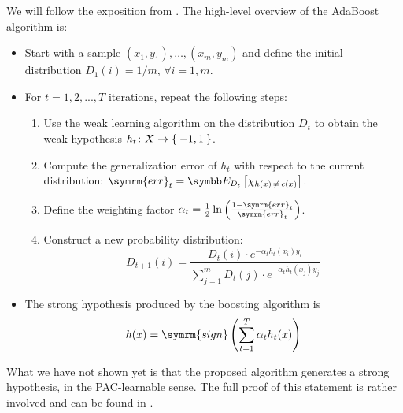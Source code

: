 We will follow the exposition from \cite{Schapire2018}. The high-level overview of the AdaBoost algorithm is:
\begin{itemize}
    \item Start with a sample \(\left(x_1, y_1\right), \dots, \left(x_m, y_m\right)\) and define the initial distribution \(D_1 (i) = 1/m\), \(\forall i = \overline{1, m}\).

    \item For \(t = 1, 2, ..., T\) iterations, repeat the following steps:
    \begin{enumerate}
        \item Use the weak learning algorithm on the distribution \(D_t\) to obtain the weak hypothesis \(h_t \colon X \to \Set{ -1, 1 }\).

        \item Compute the generalization error of \(h_t\) with respect to the current distribution: \(\symrm{err}_t = \expectedvalue_{D_t} \left[\chi_{h(x) \, \neq \, c(x)}\right]\).

        \item Define the weighting factor \(\alpha_t = \frac{1}{2} \ln \left(\frac{1 - \symrm{err}_t}{\symrm{err}_t}\right)\).

        \item Construct a new probability distribution:
        \[
            D_{t + 1} (i) = \frac{D_t (i) \cdot e^{- \alpha_t h_t(x_i) y_i}}{\sum_{j = 1}^{m} D_t (j) \cdot e^{- \alpha_t h_t (x_j) y_j}}
        \]
    \end{enumerate}

    \item The strong hypothesis produced by the boosting algorithm is
    \[
        h(x) = \symrm{sign} \left(\sum_{t = 1}^{T} \alpha_t h_t (x)\right)
    \]
\end{itemize}

What we have not shown yet is that the proposed algorithm generates a strong hypothesis, in the PAC-learnable sense. The full proof of this statement is rather involved and can be found in \cite{Schapire2018}.




